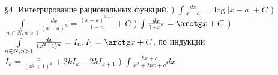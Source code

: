 \documentclass[12pt]{article}
\begin{document}
    \S 4. Интегрирование рациональных функций. ) $\int \frac{dx}{x-a} = \log |x-a| + C$ ) $\int\limits_{n \in N, n > 1} \frac{dx}{(x-a)^n} = \frac{(x-a)^{1-n}}{1-n} + C$ ) $\int \frac{dx}{1 + x^2} = \arctg x + C$ ) $\int\limits_{n \in N, n > 1} \frac{dx}{(x^2+1)^n} = I_n, I_1 = \arctg x + C$, по индукции $I_k = \frac{x}{(x^2 + 1)^k} + 2k I_k - 2k I_{k+1}$ ) $\int \frac{bx + c}{x^2 + 2px + q}dx$ \newline
\end{document}
